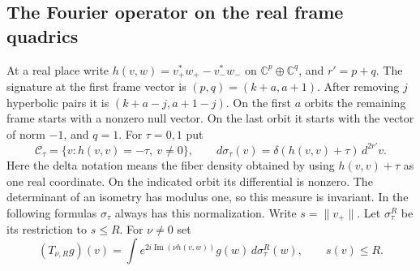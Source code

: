 \documentclass[a4paper,11pt]{article}
\theoremstyle{definition}
\theoremstyle{remark}
\numberwithin{equation}{section}
\begin{document}
\subsection{The Fourier operator on the real frame quadrics}
\label{sec:realquadrics911}

At a real place write \(h(v,w)=v_+^*w_+-v_-^*w_-\) on
\(\mathbb C^p\oplus\mathbb C^q\), and \(r'=p+q\).
The signature at the first frame vector is
\((p,q)=(k+a,a+1)\). After removing \(j\) hyperbolic pairs it
is \((k+a-j,a+1-j)\). On the first \(a\) orbits the remaining
frame starts with a nonzero null vector. On the last orbit it
starts with the vector of norm \(-1\), and \(q=1\).
For \(\tau=0,1\) put
\[
 \mathcal C_\tau=\{v:h(v,v)=-\tau,\ v\ne0\},\qquad
 d\sigma_\tau(v)=\delta(h(v,v)+\tau)\,d^{2r'}v .
\]
Here the delta notation means the fiber density obtained by
using \(h(v,v)+\tau\) as one real coordinate. On the indicated
orbit its differential is nonzero. The determinant of an
isometry has modulus one, so this measure is invariant.
In the following formulas \(\sigma_\tau\) always has this
normalization. Write \(s=\|v_+\|\). Let \(\sigma_\tau^R\) be
its restriction to \(s\le R\). For \(\nu\ne0\) set
\[
 (T_{\nu,R}g)(v)
   =\int e^{2i\operatorname{Im}(\nu h(v,w))}
               g(w)\,d\sigma_\tau^R(w),\qquad s(v)\le R .
\]
\end{document}
